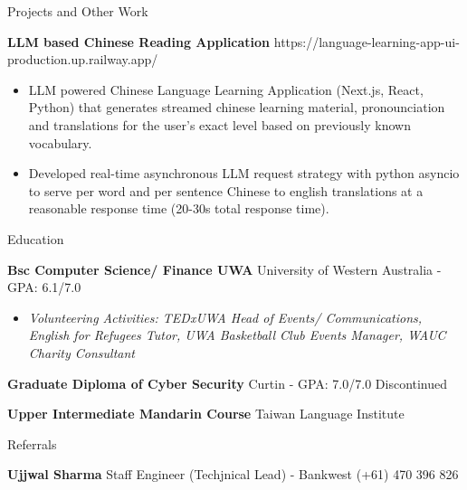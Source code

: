 \documentclass{resume} %
\begin{document}
	\begin{rSection}{Projects and Other Work}
		\vspace{-0.8em}
		\item \textbf{LLM based Chinese Reading Application} {\hfill {} https://language-learning-app-ui-production.up.railway.app/}  
		\begin{itemize} 
			\item LLM powered Chinese Language Learning Application (Next.js, React, Python) that generates streamed chinese learning material, pronounciation and translations for the user's exact level based on previously known vocabulary.
			\item Developed real-time asynchronous LLM request strategy with python asyncio to serve per word and per sentence Chinese to english translations at a reasonable response time (20-30s total response time). 
		\end{itemize}
	\end{rSection} 
	
	\begin{rSection}{Education}
		\vspace{-0.8em}
		\item \textbf{Bsc Computer Science/ Finance UWA} {University of Western Australia} - GPA: 6.1/7.0 \hfill 
		\begin{itemize} 
			\scriptsize\item \textit{Volunteering Activities: TEDxUWA Head of Events/ Communications, English for Refugees Tutor, UWA Basketball Club Events Manager, WAUC Charity Consultant} \hfill
		\end{itemize}
		\item \textbf{Graduate Diploma of Cyber Security} {Curtin} - GPA: 7.0/7.0 \hfill Discontinued
		\item \textbf{Upper Intermediate Mandarin Course} {Taiwan Language Institute}\hfill 
	\end{rSection} 

	\begin{rSection}{Referrals} 
		\vspace{-0.8em}
		\item \textbf{Ujjwal Sharma} {Staff Engineer (Techjnical Lead) - Bankwest} 
			\hfill 
			 (+61) 470 396 826
	\end{rSection}
\end{document}
